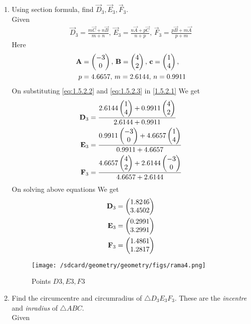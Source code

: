\documentclass[11pt]{book}
\begin{document}
\begin{enumerate}[label=\thesection.\arabic*.,ref=\thesection.\theenumi]
\item Using section formula, find $\vec{D}_3, \vec{E}_3, \vec{F}_3$. \\
\solution Given
\begin{align}
			\vec{D}_3 = \frac{m\vec{C}+n\vec{B}}{m+n},\,
			\vec{E}_3 = \frac{n\vec{A}+p\vec{C}}{n+p},\,
			\vec{F}_3 = \frac{p\vec{B}+m\vec{A}}{p+m} \label{eq:1.5.2.1}
\end{align}
Here
\begin{align}
	\vec{A} &= \myvec{-3 \\ 0},\,
	\vec{B} = \myvec{4\\2},\,
	\vec{c} = \myvec{1\\4},\, \label{eq:1.5.2.2} \\
	p &= 4.6657,\,
	m = 2.6144,\,
	n = 0.9911  \label{eq:1.5.2.3}
\end{align}
On substituting \eqref{eq:1.5.2.2} and \eqref{eq:1.5.2.3} in \eqref{1.5.2.1} We get
\begin{align}
    \mathbf{D}_3 &= \frac{2.6144\begin{pmatrix}1 \\ 4\end{pmatrix} + 0.9911\begin{pmatrix}4\\2\end{pmatrix}}{2.6144+0.9911 } \\
    \mathbf{E}_3 &= \frac{0.9911\begin{pmatrix}-3 \\ 0\end{pmatrix} + 4.6657\begin{pmatrix}1\\4\end{pmatrix}}{0.9911+4.6657} \\
    \mathbf{F}_3 &= \frac{4.6657\begin{pmatrix}4 \\ 2\end{pmatrix} + 2.6144\begin{pmatrix}-3\\0\end{pmatrix}}{4.6657+2.6144}
\end{align}
On solving above equations We get 
\begin{align}
    \mathbf{D}_3 &= \begin{pmatrix}1.8246  \\ 3.4502\end{pmatrix} \\
    \mathbf{E}_3 &= \begin{pmatrix}0.2991  \\ 3.2991\end{pmatrix} \\
    \mathbf{F}_3 &= \begin{pmatrix}1.4861  \\ 1.2817\end{pmatrix} 
\end{align}
\begin{figure}[H]
\texttt{[image: /sdcard/geometry/geometry/figs/rama4.png]}
\caption{Points $D3,E3,F3$}
\label{fig:fig1}
\end{figure}
\item Find the circumcentre and circumradius of $\triangle D_3E_3F_3$.  These are the {\em incentre} and {\em inradius} of $\triangle ABC$. \\
\solution Given 

\end{enumerate}
\end{document}
